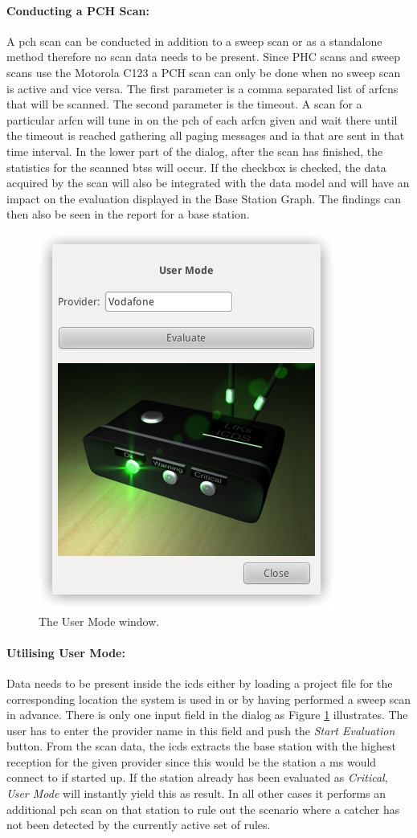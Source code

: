 \paragraph{Conducting a PCH Scan:} A \gls{pch} scan can be conducted in addition to a sweep scan or as a standalone method therefore no scan data needs to be present.
Since PHC scans and sweep scans use the Motorola C123 a PCH scan can only be done when no sweep scan is active and vice versa.
The first parameter is a comma separated list of \glspl{arfcn} that will be scanned.
The second parameter is the timeout. 
A scan for a particular \gls{arfcn} will tune in on the \gls{pch} of each \gls{arfcn} given and wait there until the timeout is reached gathering all paging messages and \gls{ia} that are sent in that time interval.
In the lower part of the dialog, after the scan has finished, the statistics for the scanned \glspl{bts} will occur.
If the checkbox is checked, the data acquired by the scan will also be integrated with the data model and will have an impact on the evaluation displayed in the Base Station Graph.
The findings can then also be seen in the report for a base station.

\begin{figure}
\centering
\includegraphics[width=.4\textwidth]{../Images/user_window}
\caption{The User Mode window.}
\label{fig:user_mode}
\end{figure}

\paragraph{Utilising User Mode:} Data needs to be present inside the \gls{icds} either by loading a project file for the corresponding location the system is used in or by having performed a sweep scan in advance.
There is only one input field in the dialog as Figure \ref{fig:user_mode} illustrates.
The user has to enter the provider name in this field and push the \emph{Start Evaluation} button.
From the scan data, the \gls{icds} extracts the base station with the highest reception for the given provider since this would be the station a \gls{ms} would connect to if started up.
If the station already has been evaluated as \emph{Critical}, \emph{User Mode} will instantly yield this as result.
In all other cases it performs an additional \gls{pch} scan on that station to rule out the scenario where a catcher has not been detected by the currently active set of rules.

